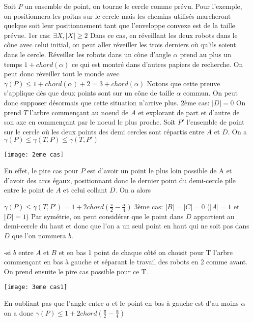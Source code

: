 Soit $P$ un ensemble de point, on tourne le cercle comme prévu. Pour l'exemple, on positionnera les poitns sur le cercle mais les chemins utilisés marcheront quelque soit leur positionnement tant que l'enveloppe convexe est de la taille prévue.
\newline
\newline
1er cas: $\exists X, |X| \geq 2$
Dans ce cas, en réveillant les deux robots dans le cône avec celui initial, on peut aller réveiller les trois derniers où qu'ils soient dans le cercle. Réveiller les robots dans un cône d'angle $\alpha$ prend au plus un temps $1 + chord(\alpha)$ ce qui est montré dans d'autres papiers de recherche.
On peut donc réveiller tout le monde avec $\gamma(P) \leq 1 + chord(\alpha) + 2 = 3 + chord(\alpha)$
Notons que cette preuve s'applique dès que deux points sont sur un cône de taille $\alpha$ commun. On peut donc supposer désormais que cette situation n'arrive plus.
\newline
\newline
2ème cas: $|D| = 0$
On prend $T$ l'arbre commençant au noeud de $A$ et explorant de part et d'autre de son axe en commençant par le noeud le plus proche.
Soit $P'$ l'ensemble de point sur le cercle où les deux points des demi cercles sont répartis entre $A$ et $D$.
On a $\gamma(P) \leq  \gamma(T, P) \leq \gamma(T, P')$

\texttt{[image: 2eme cas]}

En effet, le pire cas pour $P$ est d'avoir un point le plus loin possible de A et d'avoir des arcs égaux, positionnant donc le dernier point du demi-cercle pile entre le point de $A$ et celui collant $D$. On a alors

$\gamma(P) \leq \gamma(T, P') = 1 + 2chord(\frac{\pi}{2} - \frac{\alpha}{4})$
\newline
\newline
3ème cas: $|B| = |C| = 0$ ($|A| = 1$ et $|D| = 1$)
Par symétrie, on peut considérer que le point dans $D$ appartient au demi-cercle du haut et donc que l'on a un seul point en haut qui ne soit pas dans $D$ que l'on nommera $b$.

-si $b$ entre $A$ et $B$ et en bas 1 point de chaque côté
on choisit pour T l'arbre commençant en bas à gauche et séparant le travail des robots en 2 comme avant.
On prend ensuite le pire cas possible pour ce T.

\texttt{[image: 3eme cas1]}

En oubliant pas que l'angle entre $a$ et le point en bas à gauche est d'au moins $\alpha$ on a donc 
$\gamma(P) \leq 1 + 2chord(\frac{\pi}{2} - \frac{\alpha}{4})$

